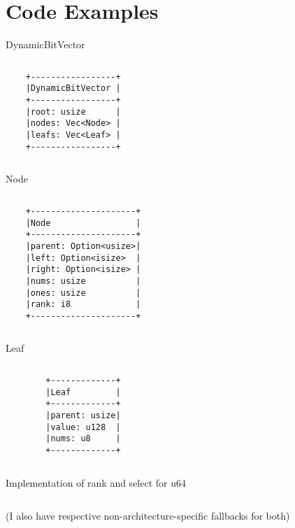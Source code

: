 \section{Code Examples}

\begin{frame}[c,fragile]{DynamicBitVector}
    \begin{columns}
    \begin{verbatim}
    +-----------------+
    |DynamicBitVector |
    +-----------------+
    |root: usize      |
    |nodes: Vec<Node> |
    |leafs: Vec<Leaf> |
    +-----------------+
    \end{verbatim}
    \inputminted[linenos=true]{rust}{code/dbv.rs}
    \end{columns}
\end{frame}


\begin{frame}[c,fragile]{Node}
    \begin{columns}
    \begin{verbatim}
    +---------------------+
    |Node                 |
    +---------------------+
    |parent: Option<usize>|
    |left: Option<isize>  |
    |right: Option<isize> |
    |nums: usize          |
    |ones: usize          |
    |rank: i8             |
    +---------------------+
    \end{verbatim}
    \inputminted[linenos=true,fontsize=\small]{rust}{code/node.rs}
    \end{columns}
\end{frame}


\begin{frame}[c,fragile]{Leaf}
    \begin{columns}
    \begin{verbatim}
        +-------------+
        |Leaf         |
        +-------------+
        |parent: usize|
        |value: u128  |
        |nums: u8     |
        +-------------+
    \end{verbatim}
    \inputminted[linenos=true]{rust}{code/leaf.rs}
    \end{columns}
\end{frame}


\begin{frame}[c]{Implementation of rank and select for u64}
    \inputminted[linenos=true,fontsize=\small]{rust}{code/u64.rs}
    (I also have respective non-architecture-specific fallbacks for both)
\end{frame}


